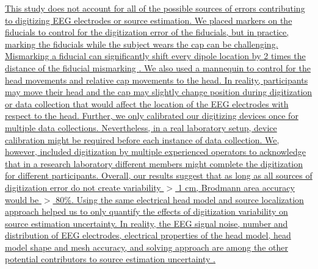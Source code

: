 \documentclass[../thesis_seyed.tex]{subfiles}
\begin{document}
\ul{This study does not account for all of the possible sources of errors contributing to digitizing EEG electrodes or source estimation. We placed markers on the fiducials to control for the digitization error of the fiducials, but in practice, marking the fiducials while the subject wears the cap can be challenging. Mismarking a fiducial can significantly shift every dipole location by 2 times the distance of the fiducial mismarking \cite{Shirazi2019-ke}. We also used a mannequin to control for the head movements and relative cap movements to the head. In reality, participants may move their head and the cap may slightly change position during digitization or data collection that would affect the location of the EEG electrodes with respect to the head. Further, we only calibrated our digitizing devices once for multiple data collections. Nevertheless, in a real laboratory setup, device calibration might be required before each instance of data collection. We, however, included digitization by multiple experienced operators to acknowledge that in a research laboratory different members might complete the digitization for different participants. Overall, our results suggest that as long as all sources of digitization error do not create variability $>$ 1 cm, Brodmann area accuracy would be $>$ 80\%. Using the same electrical head model and source localization approach helped us to only quantify the effects of digitization variability on source estimation uncertainty. In reality, the EEG signal noise, number and distribution of EEG electrodes, electrical properties of the head model, head model shape and mesh accuracy, and solving approach are among the other potential contributors to source estimation uncertainty \cite{Akalin_Acar2013-rv,Akalin_Acar2016-jr,Mahjoory2017-jv,Dalal2014-nk,Song2015-fv,Beltrachini2019-lf}.}
\end{document}
